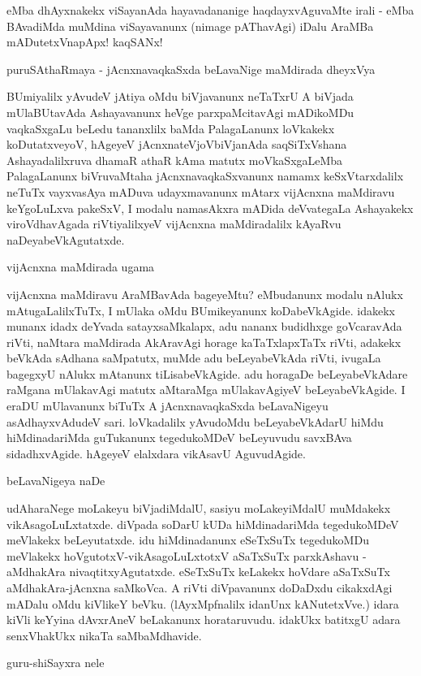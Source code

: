 eMba dhAyxnakekx viSayanAda hayavadananige haqdayxvAguvaMte irali - eMba BAvadiMda muMdina viSayavanunx (nimage pAThavAgi) iDalu AraMBa mADutetxVnapApx! kaqSANx!

puruSAthaRmaya - jAcnxnavaqkaSxda beLavaNige maMdirada dheyxVya

BUmiyalilx yAvudeV jAtiya oMdu biVjavanunx neTaTxrU A biVjada mUlaBUtavAda Ashayavanunx heVge parxpaMcitavAgi mADikoMDu vaqkaSxgaLu beLedu tananxlilx baMda PalagaLanunx loVkakekx koDutatxveyoV, hAgeyeV jAcnxnateVjoVbiVjanAda saqSiTxVshana Ashayadalilxruva dhamaR athaR kAma matutx moVkaSxgaLeMba PalagaLanunx biVruvaMtaha jAcnxnavaqkaSxvanunx namamx keSxVtarxdalilx neTuTx vayxvasAya mADuva udayxmavanunx mAtarx vijAcnxna maMdiravu keYgoLuLxva pakeSxV, I modalu namasAkxra mADida deVvategaLa Ashayakekx viroVdhavAgada riVtiyalilxyeV vijAcnxna maMdiradalilx kAyaRvu naDeyabeVkAgutatxde.

vijAcnxna maMdirada ugama

vijAcnxna maMdiravu AraMBavAda bageyeMtu? eMbudanunx modalu nAlukx mAtugaLalilxTuTx, I mUlaka oMdu BUmikeyanunx koDabeVkAgide. idakekx munanx idadx deYvada satayxsaMkalapx, adu nananx budidhxge goVcaravAda riVti, naMtara maMdirada AkAravAgi horage kaTaTxlapxTaTx riVti, adakekx beVkAda sAdhana saMpatutx, muMde adu beLeyabeVkAda riVti, ivugaLa bagegxyU nAlukx mAtanunx tiLisabeVkAgide. adu horagaDe beLeyabeVkAdare raMgana mUlakavAgi matutx aMtaraMga mUlakavAgiyeV beLeyabeVkAgide. I eraDU mUlavanunx biTuTx A jAcnxnavaqkaSxda beLavaNigeyu asAdhayxvAdudeV sari. loVkadalilx yAvudoMdu beLeyabeVkAdarU hiMdu hiMdinadariMda guTukanunx tegedukoMDeV beLeyuvudu savxBAva sidadhxvAgide. hAgeyeV elalxdara vikAsavU AguvudAgide.

beLavaNigeya naDe

udAharaNege moLakeyu biVjadiMdalU, sasiyu moLakeyiMdalU muMdakekx vikAsagoLuLxtatxde. diVpada soDarU kUDa hiMdinadariMda tegedukoMDeV meVlakekx beLeyutatxde. idu hiMdinadanunx eSeTxSuTx tegedukoMDu meVlakekx hoVgutotxV-vikAsagoLuLxtotxV aSaTxSuTx parxkAshavu - aMdhakAra nivaqtitxyAgutatxde. eSeTxSuTx keLakekx hoVdare aSaTxSuTx aMdhakAra-jAcnxna saMkoVca. A riVti diVpavanunx doDaDxdu cikakxdAgi mADalu oMdu kiVlikeY beVku. (lAyxMpfnalilx idanUnx kANutetxVve.) idara kiVli keYyina dAvxrAneV beLakanunx horataruvudu. idakUkx batitxgU adara senxVhakUkx nikaTa saMbaMdhavide.

guru-shiSayxra nele


